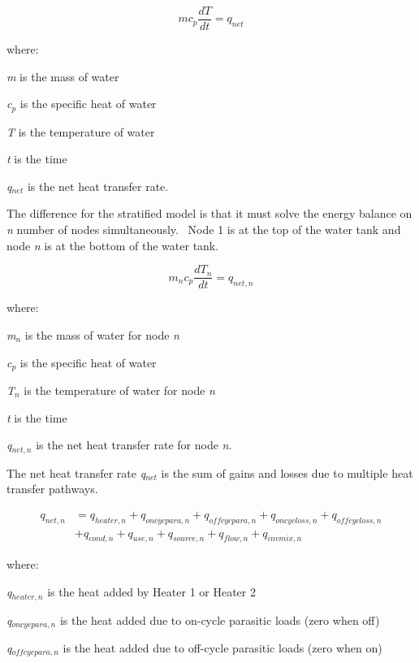 \begin{equation}
m{c_p}\frac{{dT}}{{dt}} = {q_{net}}
\end{equation}

where:

\emph{m} is the mass of water

\emph{c\(_{p}\)} is the specific heat of water

\emph{T} is the temperature of water

\emph{t} is the time

\emph{q\(_{net}\)} is the net heat transfer rate.

The difference for the stratified model is that it must solve the energy balance on \emph{n} number of nodes simultaneously.~ Node 1 is at the top of the water tank and node \emph{n} is at the bottom of the water tank.

\begin{equation}
{m_n}{c_p}\frac{{d{T_n}}}{{dt}} = {q_{net,n}}
\end{equation}

where:

\emph{m\(_{n}\)} is the mass of water for node \emph{n}

\emph{c\(_{p}\)} is the specific heat of water

\emph{T\(_{n}\)} is the temperature of water for node \emph{n}

\emph{t} is the time

\emph{q\(_{net,n}\)} is the net heat transfer rate for node \emph{n}.

The net heat transfer rate \emph{q\(_{net}\)} is the sum of gains and losses due to multiple heat transfer pathways.

\begin{equation}
  \begin{array}{ll}
    q_{net,n} &= q_{heater,n} + q_{oncycpara,n} + q_{offcycpara,n} + q_{oncycloss,n} + q_{offcycloss,n} \\ 
              &+ q_{cond,n} + q_{use,n} + q_{source,n} + q_{flow,n} + q_{invmix,n}
  \end{array}
\end{equation}

where:

\emph{q\(_{heater,n}\)} is the heat added by Heater 1 or Heater 2

\emph{q\(_{oncycpara,n}\)} is the heat added due to on-cycle parasitic loads (zero when off)

\emph{q\(_{offcycpara,n}\)} is the heat added due to off-cycle parasitic loads (zero when on)

